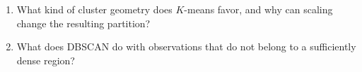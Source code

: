 \begin{quickcheck}
\begin{enumerate}
  \item What kind of cluster geometry does \(K\)-means favor, and why can scaling change the resulting partition?
  \item What does DBSCAN do with observations that do not belong to a sufficiently dense region?
\end{enumerate}
\end{quickcheck}

